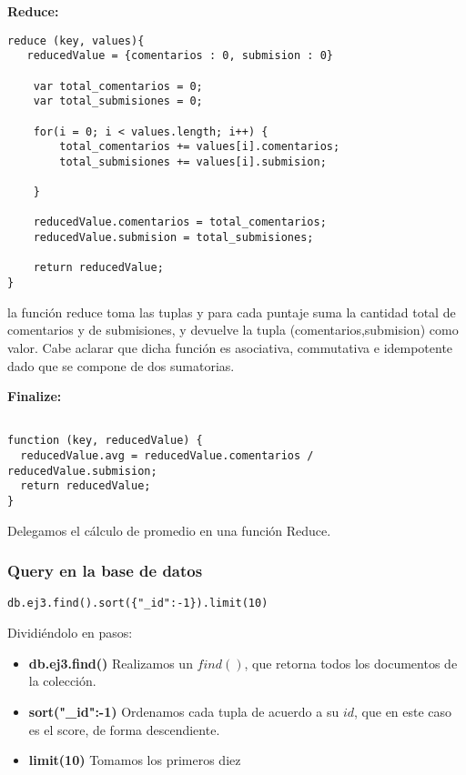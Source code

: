\textbf{Reduce:}

\begin{lstlisting}
reduce (key, values){
   reducedValue = {comentarios : 0, submision : 0}
	
	var total_comentarios = 0;
	var total_submisiones = 0;

	for(i = 0; i < values.length; i++) {
		total_comentarios += values[i].comentarios;
		total_submisiones += values[i].submision;

	}

	reducedValue.comentarios = total_comentarios;
	reducedValue.submision = total_submisiones;

    return reducedValue;
}

\end{lstlisting}

la funci\'on reduce toma las tuplas y para cada puntaje suma la cantidad total de comentarios y de submisiones, y devuelve la tupla (comentarios,submision) como valor. Cabe aclarar que dicha funci\'on es asociativa, commutativa e idempotente dado que se compone de dos sumatorias.

\textbf{Finalize:}

\begin{lstlisting}

function (key, reducedValue) {
  reducedValue.avg = reducedValue.comentarios / reducedValue.submision;
  return reducedValue;
}

\end{lstlisting}

Delegamos el c\'alculo de promedio en una funci\'on Reduce.

\vspace{2mm}

\subsubsection{Query en la base de datos}

\begin{lstlisting}
db.ej3.find().sort({"_id":-1}).limit(10)
\end{lstlisting}


Dividi\'endolo en pasos:

\begin{itemize}

\item \textbf{db.ej3.find()} Realizamos un $find()$, que retorna todos los documentos de la colecci\'on.
\item \textbf{sort({"\_id":-1})} Ordenamos cada tupla de acuerdo a su $id$, que en este caso es el score, de forma descendiente.
\item \textbf{limit(10)} Tomamos los primeros diez

\end{itemize}

